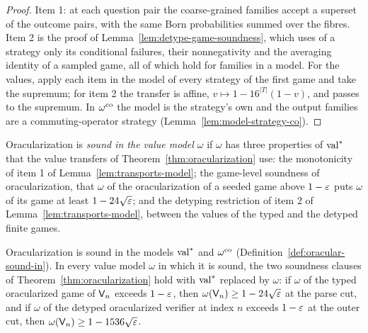 \begin{proof}
\leanok
Item 1: at each question pair the coarse-grained families accept a superset of the outcome
pairs, with the same Born probabilities summed over the fibres. Item 2 is the proof of
Lemma~\ref{lem:detype-game-soundness}, which uses of a strategy only its conditional failures,
their nonnegativity and the averaging identity of a sampled game, all of which hold for families
in a model. For the values, apply each item in the model of every strategy of the first game and
take the supremum; for item 2 the transfer is affine, $v \mapsto 1 - 16^{|T|}(1 - v)$, and
passes to the supremum. In $\omega^{\mathrm{co}}$ the model is the strategy's own and the output families
are a commuting-operator strategy (Lemma~\ref{lem:model-strategy-co}).
\end{proof}

\begin{definition}
\label{def:oracular-sound-in}
\leanok
Oracularization is \emph{sound in the value model $\omega$} if $\omega$ has three properties of
$\mathrm{val}^*$ that the value transfers of Theorem~\ref{thm:oracularization} use: the monotonicity
of item 1 of Lemma~\ref{lem:transports-model}; the game-level soundness of oracularization, that
$\omega$ of the oracularization of a seeded game above $1 - \varepsilon$ puts $\omega$ of its game at
least $1 - 24\sqrt{\varepsilon}$; and the detyping restriction of item 2 of
Lemma~\ref{lem:transports-model}, between the values of the typed and the detyped finite games.
\end{definition}

\begin{theorem}
\label{thm:oracularization-in-model}
\leanok
Oracularization is sound in the models $\mathrm{val}^*$ and $\omega^{\mathrm{co}}$
(Definition~\ref{def:oracular-sound-in}). In every value model $\omega$ in which it is sound, the
two soundness clauses of Theorem~\ref{thm:oracularization} hold with $\mathrm{val}^*$ replaced by
$\omega$: if $\omega$ of the typed oracularized game of $\mathsf{V}_n$ exceeds $1 - \varepsilon$, then
$\omega(\mathsf{V}_n) \geq 1 - 24\sqrt{\varepsilon}$ at the parse cut, and if $\omega$ of the detyped
oracularized verifier at index $n$ exceeds $1 - \varepsilon$ at the outer cut, then
$\omega(\mathsf{V}_n) \geq 1 - 1536\sqrt{\varepsilon}$.
\end{theorem}


